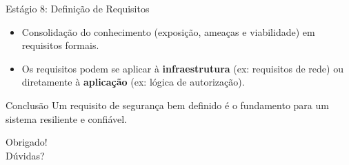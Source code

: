 \documentclass[aspectratio=169]{beamer}
\begin{document}
\begin{frame}{Estágio 8: Definição de Requisitos}
    \begin{itemize}
        \item Consolidação do conhecimento (exposição, ameaças e viabilidade) em requisitos formais.
        \item Os requisitos podem se aplicar à \textbf{infraestrutura} (ex: requisitos de rede) ou diretamente à \textbf{aplicação} (ex: lógica de autorização).
    \end{itemize}
    \begin{exampleblock}{Conclusão}
        Um requisito de segurança bem definido é o fundamento para um sistema resiliente e confiável.
    \end{exampleblock}
\end{frame}

\begin{frame}
  \centering
  \Huge Obrigado!\\
  \vspace{1cm}
  \large Dúvidas?
\end{frame}

\end{document}
